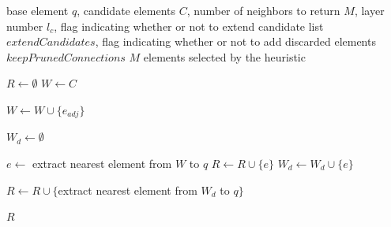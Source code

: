 \begin{algorithm}[H]
    \caption{SELECT-NEIGHBORS-HEURISTIC \cite{Malkov-Yashunin-2016}}
    \label{alg:hnsw-4}
    \begin{algorithmic}[1]
        \Require base element $q$, candidate elements $C$, number of neighbors to return $M$, layer number $l_c$, flag indicating whether or not to extend candidate list $extendCandidates$, flag indicating whether or not to add discarded elements $keepPrunedConnections$
        \Ensure $M$ elements selected by the heuristic

        \State $R \gets \emptyset$
        \State $W \gets C$ 

         
                        \State $W \gets W \cup \{e_{adj}\}$
                    \EndIf
                \EndFor
            \EndFor
        \EndIf

        \State $W_d \gets \emptyset$ 

            \State $e \gets$ extract nearest element from $W$ to $q$
                \State $R \gets R \cup \{e\}$
            \Else
                \State $W_d \gets W_d \cup \{e\}$
            \EndIf
        \EndWhile

         
                \State $R \gets R \cup \{$extract nearest element from $W_d$ to $q\}$
            \EndWhile
        \EndIf

        \State \Return $R$
    \end{algorithmic}
\end{algorithm}